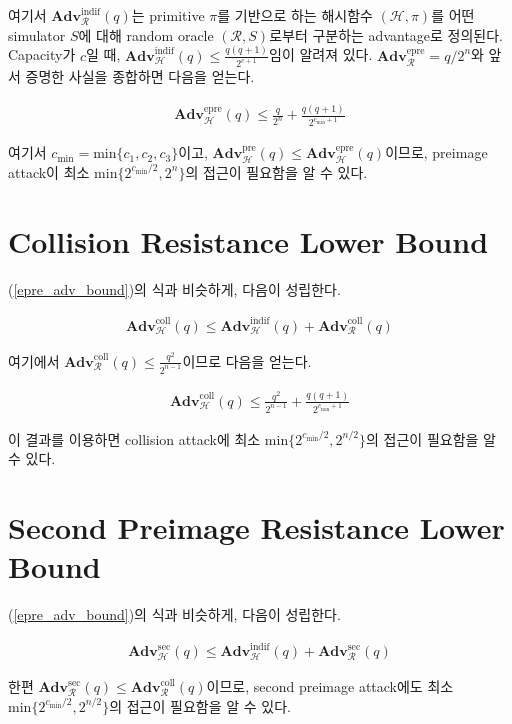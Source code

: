 \documentclass{article}
\newcommand{\adv}{\mathbf{Adv}}
\begin{document}
  여기서 \(\adv^\text{indif}_\mathcal{R}(q)\)는 primitive \(\pi\)를 기반으로 하는 해시함수 \((\mathcal{H}, \pi)\)를 어떤 simulator \(S\)에 대해 random oracle \((\mathcal{R}, S)\)로부터 구분하는 advantage로 정의된다. Capacity가 \(c\)일 때, \(\adv^\text{indif}_\mathcal{H}(q)\leq \frac{q(q + 1)}{2^{c + 1}}\)임이 알려져 있다. \(\adv^\text{epre}_\mathcal{R}=q/2^n\)와 앞서 증명한 사실을 종합하면 다음을 얻는다.

  \begin{align*}
    \adv^\text{epre}_\mathcal{H}(q) \leq \frac{q}{2^n} + \frac{q(q + 1)}{2^{c_\mathrm{min} + 1}}
  \end{align*}

  여기서 \(c_\mathrm{min}=\mathrm{min}\{c_1, c_2, c_3\}\)이고, \(\adv^\text{pre}_\mathcal{H}(q) \leq \adv^\text{epre}_\mathcal{H}(q)\)이므로\cite{rogaway_cryptographic_2004}, preimage attack이 최소 \(\mathrm{min}\{2^{c_\mathrm{min}/2}, 2^n\}\)의 접근이 필요함을 알 수 있다.

  \section{Collision Resistance Lower Bound}
  (\ref{epre_adv_bound})의 식과 비슷하게, 다음이 성립한다.

  \begin{align*}
    \adv^\text{coll}_\mathcal{H}(q) \leq \adv^\text{indif}_\mathcal{H}(q) + \adv^\text{coll}_\mathcal{R}(q)
  \end{align*}

  여기에서 \(\adv^\text{coll}_\mathcal{R}(q) \leq \frac{q^2}{2^{n - 1}}\)이므로 다음을 얻는다.

  \begin{align*}
    \adv^\text{coll}_\mathcal{H}(q) \leq \frac{q^2}{2^{n - 1}} + \frac{q(q + 1)}{2^{c_\mathrm{min} + 1}}
  \end{align*}

  이 결과를 이용하면 collision attack에 최소 \(\mathrm{min}\{2^{c_\mathrm{min}/2}, 2^{n/2}\}\)의 접근이 필요함을 알 수 있다.

  \section{Second Preimage Resistance Lower Bound}
  (\ref{epre_adv_bound})의 식과 비슷하게, 다음이 성립한다.

  \begin{align*}
    \adv^\text{sec}_\mathcal{H}(q) \leq \adv^\text{indif}_\mathcal{H}(q) + \adv^\text{sec}_\mathcal{R}(q)
  \end{align*}

  한편 \(\adv^\text{sec}_\mathcal{R}(q) \leq \adv^\text{coll}_\mathcal{R}(q)\)이므로, second preimage attack에도 최소 \(\mathrm{min}\{2^{c_\mathrm{min}/2}, 2^{n/2}\}\)의 접근이 필요함을 알 수 있다.
  \printbibliography
\end{document}
